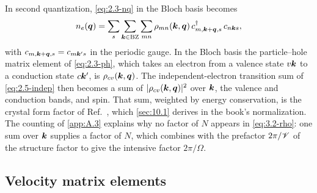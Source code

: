 In second quantization, \cref{eq:2.3-nq} in the Bloch basis becomes
\begin{equation}
  n_e(\bm{q}) = \sum_{s}\sum_{\bm{k}\in\mathrm{BZ}}\sum_{mn}\rho_{mn}(\bm{k},\bm{q})\,c^\dagger_{m,\bm{k}+\bm{q},s}\,c_{n\bm{k}s},
  \label{eq:3.2-ne}
\end{equation}
with $c_{m,\bm{k}+\bm{q},s} = c_{m\bm{k}'s}$ in the periodic gauge. In the Bloch basis the particle--hole matrix element of \cref{eq:2.3-ph}, which takes an electron from a valence state $v\bm{k}$ to a conduction state $c\bm{k}'$, is $\rho_{cv}(\bm{k},\bm{q})$. The independent-electron transition sum of \cref{eq:2.5-indep} then becomes a sum of $|\rho_{cv}(\bm{k},\bm{q})|^2$ over $\bm{k}$, the valence and conduction bands, and spin. That sum, weighted by energy conservation, is the crystal form factor of Ref.~\cite[Eq.~(3.17)]{essig2016direct}, which \cref{sec:10.1} derives in the book's normalization. The counting of \cref{app:A.3} explains why no factor of $N$ appears in \cref{eq:3.2-rho}: one sum over $\bm{k}$ supplies a factor of $N$, which combines with the prefactor $2\pi/\mathscr{V}$ of the structure factor to give the intensive factor $2\pi/\Omega$.

\subsection{Velocity matrix elements}

